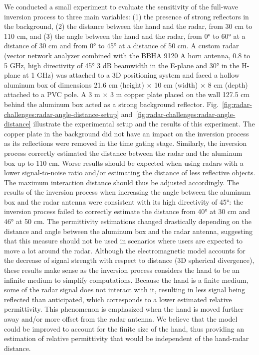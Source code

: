 We conducted a small experiment to evaluate the sensitivity of the full-wave inversion process to three main variables: (1) the presence of strong reflectors in the background, (2) the distance between the hand and the radar, from 30 cm to 110 cm, and (3) the angle between the hand and the radar, from 0° to 60° at a distance of 30 cm and from 0° to 45° at a distance of 50 cm. 
%
A custom radar (vector network analyzer combined with the BBHA 9120 A horn antenna, 0.8 to 5 GHz, high directivity of 45° 3 dB beamwidth in the E-plane and 30° in the H-plane at 1 GHz) was attached to a 3D positioning system and faced a hollow aluminum box of dimensions 21.6 cm (height) $\times$ 10 cm (width) $\times$ 8 cm (depth) attached to a PVC pole. A 3 m $\times$ 3 m copper plate placed on the wall 127.5 cm behind the aluminum box acted as a strong background reflector. Fig.~\ref{fig:radar-challenges:radar-angle-distance-setup} and~\ref{fig:radar-challenges:radar-angle-distance} illustrate the experimental setup and the results of this experiment. 
%
The copper plate in the background did not have an impact on the inversion process as its reflections were removed in the time gating stage.
%
Similarly, the inversion process correctly estimated the distance between the radar and the aluminum box up to 110 cm. Worse results should be expected when using radars with a lower signal-to-noise ratio and/or estimating the distance of less reflective objects. The maximum interaction distance should thus be adjusted accordingly.
%
The results of the inversion process when increasing the angle between the aluminum box and the radar antenna were consistent with its high directivity of 45°: the inversion process failed to correctly estimate the distance from 40° at 30 cm and 46° at 50 cm.
%
The permittivity estimations changed drastically depending on the distance and angle between the aluminum box and the radar antenna, suggesting that this measure should not be used in scenarios where users are expected to move a lot around the radar. 
Although the electromagnetic model accounts for the decrease of signal strength with respect to distance (3D spherical divergence), these results make sense as the inversion process considers the hand to be an infinite medium to simplify computations. Because the hand is a finite medium, some of the radar signal does not interact with it, resulting in less signal being reflected than anticipated, which corresponds to a lower estimated relative permittivity. This phenomenon is emphasized when the hand is moved further away and/or more offset from the radar antenna. 
%
We believe that the model could be improved to account for the finite size of the hand, thus providing an estimation of relative permittivity that would be independent of the hand-radar distance.


